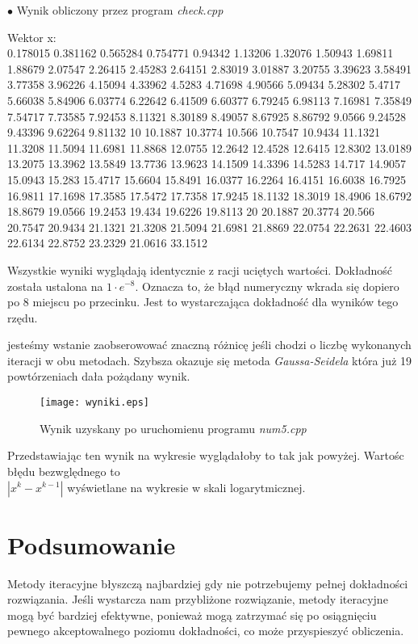 \documentclass{article}
\begin{document}
\begin{center}
      \begin{flushleft}
        $\bullet$ Wynik obliczony przez program \textit{check.cpp}
      \end{flushleft}

      \begin{tcolorbox}
        Wektor x:\\
        0.178015 0.381162 0.565284 0.754771 0.94342 1.13206 1.32076 1.50943 1.69811 1.88679 2.07547 2.26415 2.45283 2.64151 2.83019 3.01887 3.20755 3.39623 3.58491 3.77358 3.96226 4.15094 4.33962 4.5283 4.71698 4.90566 5.09434 5.28302 5.4717 5.66038 5.84906 6.03774 6.22642 6.41509 6.60377 6.79245 6.98113 7.16981 7.35849 7.54717 7.73585 7.92453 8.11321 8.30189 8.49057 8.67925 8.86792 9.0566 9.24528 9.43396 9.62264 9.81132 10 10.1887 10.3774 10.566 10.7547 10.9434 11.1321 11.3208 11.5094 11.6981 11.8868 12.0755 12.2642 12.4528 12.6415 12.8302 13.0189 13.2075 13.3962 13.5849 13.7736 13.9623 14.1509 14.3396 14.5283 14.717 14.9057 15.0943 15.283 15.4717 15.6604 15.8491 16.0377 16.2264 16.4151 16.6038 16.7925 16.9811 17.1698 17.3585 17.5472 17.7358 17.9245 18.1132 18.3019 18.4906 18.6792 18.8679 19.0566 19.2453 19.434 19.6226 19.8113 20 20.1887 20.3774 20.566 20.7547 20.9434 21.1321 21.3208 21.5094 21.6981 21.8869 22.0754 22.2631 22.4603 22.6134 22.8752 23.2329 21.0616 33.1512 
      \end{tcolorbox}
    \end{center}

    Wszystkie wyniki wyglądają identycznie z racji uciętych wartości. Dokładność została ustalona na $1 \cdot e^{-8}$. Oznacza to, że błąd numeryczny wkrada się dopiero po 8 miejscu po przecinku. Jest to wystarczająca dokładność dla wyników tego rzędu.

    jesteśmy wstanie zaobserowować znaczną różnicę jeśli chodzi o liczbę wykonanych iteracji w obu metodach. Szybsza okazuje się metoda \textit{Gaussa-Seidela} która już 19 powtórzeniach dała pożądany wynik.
    \begin{figure}[!ht]
      \centering
      \texttt{[image: wyniki.eps]}
      \caption{Wynik uzyskany po uruchomienu programu \textit{num5.cpp}}
    \end{figure}
  \newpage
  Przedstawiając ten wynik na wykresie wyglądałoby to tak jak powyżej. Wartośc błędu bezwględnego to \\ $|x^k - x^{k-1}|$ wyświetlane na wykresie w skali logarytmicznej.


  \section{Podsumowanie}
  Metody iteracyjne błyszczą najbardziej gdy nie potrzebujemy pełnej dokładności rozwiązania. Jeśli wystarcza nam przybliżone rozwiązanie, metody iteracyjne mogą być bardziej efektywne, ponieważ mogą zatrzymać się po osiągnięciu pewnego akceptowalnego poziomu dokładności, co może przyspieszyć obliczenia.
  
\end{document}
